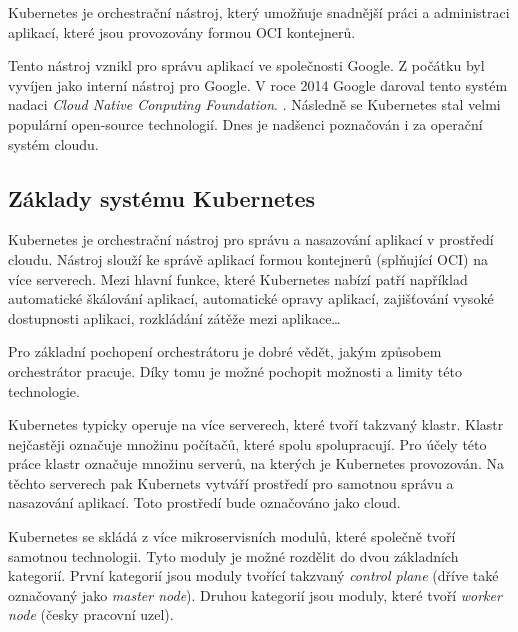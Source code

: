 Kubernetes je orchestrační nástroj, který umožňuje snadnější práci a administraci aplikací, které jsou provozovány formou OCI kontejnerů.

Tento nástroj vznikl pro správu aplikací ve společnosti Google. Z počátku byl vyvíjen jako interní nástroj pro Google. V roce 2014 Google daroval tento systém nadaci \textit{Cloud Native Conputing Foundation}. \cite{poulton_2022_the}. Následně se Kubernetes stal velmi populární open-source technologií. Dnes je nadšenci poznačován i za operační systém cloudu. \cite{poulton_2022_the}%


\subsection{Základy systému Kubernetes}

Kubernetes je orchestrační nástroj pro správu a nasazování aplikací v prostředí cloudu. Nástroj slouží ke správě aplikací formou kontejnerů (splňující OCI) na více serverech. Mezi hlavní funkce, které Kubernetes nabízí patří například automatické škálování aplikací, automatické opravy aplikací, zajišťování vysoké dostupnosti aplikaci, rozkládání zátěže mezi aplikace\ldots \cite{nassimkebbani_2022_the}

Pro základní pochopení orchestrátoru je dobré vědět, jakým způsobem orchestrátor pracuje. Díky tomu je možné pochopit možnosti a limity této technologie.

Kubernetes typicky operuje na více serverech, které tvoří takzvaný klastr. Klastr nejčastěji označuje množinu počítačů, které spolu spolupracují. Pro účely této práce klastr označuje množinu serverů, na kterých je Kubernetes provozován. Na těchto serverech pak Kubernets vytváří prostředí pro samotnou správu a nasazování aplikací. Toto prostředí bude označováno jako cloud.

Kubernetes se skládá z více mikroservisních modulů, které společně tvoří samotnou technologii. Tyto moduly je možné rozdělit do dvou základních kategorií. První kategorií jsou moduly tvořící takzvaný \textit{control plane} (dříve také označovaný jako \textit{master node}). Druhou kategorií jsou moduly, které tvoří \textit{worker node} (česky pracovní uzel).

